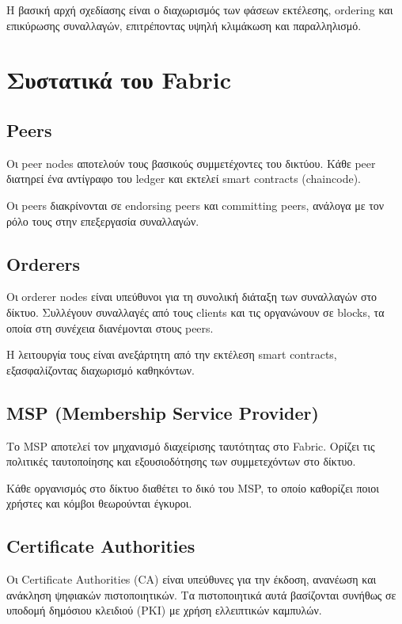 \documentclass[12pt,a4paper]{report}
\begin{document}
Η βασική αρχή σχεδίασης είναι ο διαχωρισμός των φάσεων εκτέλεσης, ordering και επικύρωσης συναλλαγών, επιτρέποντας υψηλή κλιμάκωση και παραλληλισμό.

\section{Συστατικά του Fabric}

\subsection{Peers}

Οι peer nodes αποτελούν τους βασικούς συμμετέχοντες του δικτύου. Κάθε peer διατηρεί ένα αντίγραφο του ledger και εκτελεί smart contracts (chaincode).

Οι peers διακρίνονται σε endorsing peers και committing peers, ανάλογα με τον ρόλο τους στην επεξεργασία συναλλαγών.

\subsection{Orderers}

Οι orderer nodes είναι υπεύθυνοι για τη συνολική διάταξη των συναλλαγών στο δίκτυο. Συλλέγουν συναλλαγές από τους clients και τις οργανώνουν σε blocks, τα οποία στη συνέχεια διανέμονται στους peers.

Η λειτουργία τους είναι ανεξάρτητη από την εκτέλεση smart contracts, εξασφαλίζοντας διαχωρισμό καθηκόντων.

\subsection{MSP (Membership Service Provider)}

Το MSP αποτελεί τον μηχανισμό διαχείρισης ταυτότητας στο Fabric. Ορίζει τις πολιτικές ταυτοποίησης και εξουσιοδότησης των συμμετεχόντων στο δίκτυο.

Κάθε οργανισμός στο δίκτυο διαθέτει το δικό του MSP, το οποίο καθορίζει ποιοι χρήστες και κόμβοι θεωρούνται έγκυροι.

\subsection{Certificate Authorities}

Οι Certificate Authorities (CA) είναι υπεύθυνες για την έκδοση, ανανέωση και ανάκληση ψηφιακών πιστοποιητικών. Τα πιστοποιητικά αυτά βασίζονται συνήθως σε υποδομή δημόσιου κλειδιού (PKI) με χρήση ελλειπτικών καμπυλών.
\end{document}
